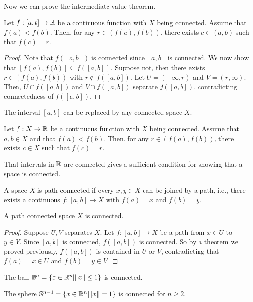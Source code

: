Now we can prove the intermediate value theorem.
\begin{theorem}
    Let $f:[a,b]\to\mathbb{R}$ be a continuous function with $X$ being connected. Assume that $f(a)<f(b)$. Then, for any $r\in (f(a),f(b))$, there exists $c\in (a,b)$ such that $f(c)=r$.
\end{theorem}
\begin{proof}
    Note that $f([a,b])$ is connected since $[a,b]$ is connected. We now show that  $[f(a),f(b)]\subseteq f([a,b])$. Suppose not, then there exists $r\in (f(a),f(b))$ with $r\notin f([a,b])$. Let $U=(-\infty,r)$ and $V=(r,\infty)$. Then, $U\cap f([a,b])$ and $V\cap f([a,b])$ separate $f([a,b])$, contradicting connectedness of $f([a,b])$.
\end{proof}

The interval $[a,b]$ can be replaced by any connected space $X$.
\begin{theorem}
    Let $f:X\to\mathbb{R}$ be a continuous function with $X$ being connected. Assume that $a,b\in X$ and that $f(a)<f(b)$. Then, for any $r\in (f(a),f(b))$, there exists $c\in X$ such that $f(c)=r$.
\end{theorem}

That intervals in $\mathbb{R}$ are connected gives a sufficient condition for showing that a space is connected.



\begin{definition}
    A space $X$ is path connected if every $x,y\in X$ can be joined by a path, i.e., there exists a continuous $f:[a,b]\to X$ with $f(a)=x$ and $f(b)=y$.
\end{definition}

\begin{lemma}
    A path connected space $X$ is connected.
\end{lemma}

\begin{proof}
    Suppose $U,V$ separates $X$. Let $f:[a,b]\to X$ be a path from $x\in U$ to $y\in V$. Since $[a,b]$ is connected, $f([a,b])$ is connected. So by a theorem we proved previously, $f([a,b])$ is contained in $U$ or $V$, contradicting that $f(a)=x\in U$ and $f(b)=y\in V$.
\end{proof}

\begin{example}
    The ball $\mathbb{B}^n=\{x\in\mathbb{R}^n|\|x\|\leq 1\}$ is connected.

    The sphere $\mathbb{S}^{n-1}=\{x\in\mathbb{R}^n|\|x\|= 1\}$ is connected for $n\geq 2$.
\end{example}

